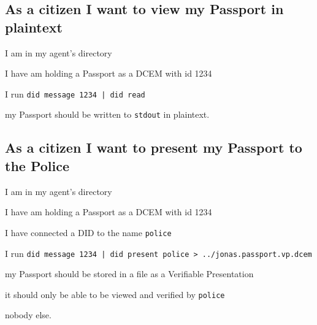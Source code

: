 \subsection{As a citizen I want to view my Passport in plaintext}
\begin{description}[1.35cm]
    \item[Given] I am in my agent's directory
    \item[and] I have am holding a Passport as a DCEM with id 1234
    \item[When] I run \texttt{did message 1234 | did read}
    \item[Then] my Passport should be written to \texttt{stdout} in plaintext.
\end{description}



\subsection{As a citizen I want to present my Passport to the Police}
\begin{description}[1.35cm]
    \item[Given] I am in my agent's directory
    \item[and] I have am holding a Passport as a DCEM with id 1234
    \item[and] I have connected a DID to the name \texttt{police}
    \item[When] I run \texttt{did message 1234 | did present police > ../jonas.passport.vp.dcem}
    \item[Then] my Passport should be stored in a file as a Verifiable Presentation
    \item[and] it should only be able to be viewed and verified by \texttt{police}
    \item[and] nobody else.
\end{description}



